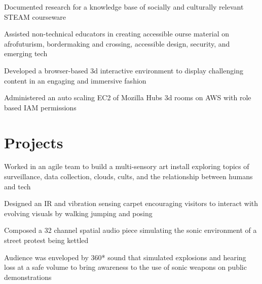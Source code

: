 \documentclass[]{quinnJarvisHollandLatex}
\begin{document}
\begin{minipage}[t]{0.60\textwidth}
\begin{tightemize}
\item Documented research for a knowledge base of socially and culturally relevant STEAM courseware
\item Assisted non-technical educators in creating accessible ourse material on afrofuturism, bordermaking and crossing, accessible design, security, and emerging tech
\item Developed a browser-based 3d interactive environment to display challenging content in an engaging and immersive fashion
\item Administered an auto scaling EC2 of Mozilla Hubs 3d rooms on AWS with role based IAM permissions
\end{tightemize}
\sectionsep
\section{Projects}
\begin{tightemize}
\item Worked in an agile team to build a multi-sensory art install exploring topics of surveillance, data collection, clouds, cults, and the relationship between humans and tech
\item Designed an IR and vibration sensing carpet encouraging visitors to interact with evolving visuals by walking jumping and posing
\end{tightemize}
\sectionsep

\begin{tightemize}
\item Composed a 32 channel spatial audio piece simulating the sonic environment of a street protest being kettled
\item Audience was enveloped by 360* sound that simulated explosions and hearing loss at a safe volume to bring awareness to the use of sonic weapons on public demonstrations
\end{tightemize}
\sectionsep



%
%

\end{minipage}
\end{document}
